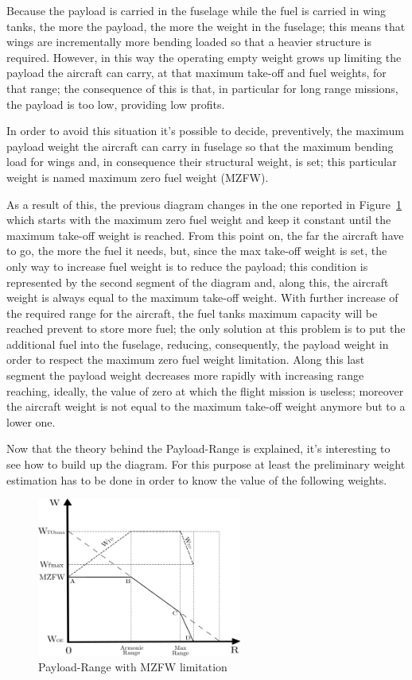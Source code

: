 \documentclass[a4paper,12pt,oneside]{book}
\begin{document}
Because the payload is carried in the fuselage while the fuel is carried in wing tanks, the more the payload, the more the weight in the fuselage; this means that wings are incrementally more bending loaded so that a heavier structure is required. However, in this way the operating empty weight grows up limiting the payload the aircraft can carry, at that maximum take-off and fuel weights, for that range; the consequence of this is that, in particular for long range missions, the payload is too low, providing low profits.

In order to avoid this situation it’s possible to decide, preventively, the maximum payload weight the aircraft can carry in fuselage so that the maximum bending load for wings and, in consequence their structural weight, is set; this particular weight is named maximum zero fuel weight (MZFW).

As a result of this, the previous diagram changes in the one reported in Figure~\ref{fig:Figure2} which starts with the maximum zero fuel weight and keep it constant until the maximum take-off weight is reached. From this point on, the far the aircraft have to go, the more the fuel it needs, but, since the max take-off weight is set, the only way to increase fuel weight is to reduce the payload; this condition is represented by the second segment of the diagram and, along this, the aircraft weight is always equal to the maximum take-off weight. With further increase of the required range for the aircraft, the fuel tanks maximum capacity will be reached prevent to store more fuel; the only solution at this problem is to put the additional fuel into the fuselage, reducing, consequently, the payload weight in order to respect the maximum zero fuel weight limitation. Along this last segment the payload weight decreases more rapidly with increasing range reaching, ideally, the value of zero at which the flight mission is useless; moreover the aircraft weight is not equal to the maximum take-off weight anymore but to a lower one.

\bigskip
Now that the theory behind the Payload-Range is explained, it’s interesting to see how to build up the diagram. For this purpose at least the preliminary weight estimation has to be done in order to know the value of the following weights.

\begin{figure}[ht]
\centering
\includegraphics[keepaspectratio, width=0.6\textwidth]{Payload_Range}
\caption{Payload-Range with MZFW limitation}
\label{fig:Figure2}
\end{figure}
\end{document}
